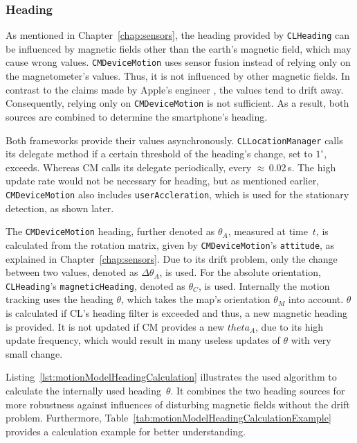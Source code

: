 \subsubsection*{Heading}
As mentioned in Chapter~\ref{chap:sensors}, the heading provided by \texttt{CLHeading} can be influenced by magnetic fields other than the earth's magnetic field, which may cause wrong values. \texttt{CMDeviceMotion} uses sensor fusion instead of relying only on the magnetometer's values. Thus, it is not influenced by other magnetic fields. In contrast to the claims made by Apple's engineer \citet{apple:wwdc_2012_pham}, the values tend to drift away. Consequently, relying only on \texttt{CMDeviceMotion} is not sufficient. As a result, both sources are combined to determine the smartphone's heading.

Both frameworks provide their values asynchronously. \texttt{CLLocationManager} calls its delegate method if a certain threshold of the heading's change, set to $1^\circ$, exceeds. Whereas \acs{CM} calls its delegate periodically, every $\approx$\,0.02\,s. The high update rate would not be necessary for heading, but as mentioned earlier, \texttt{CMDeviceMotion} also includes \texttt{userAccleration}, which is used for the stationary detection, as shown later.

The \texttt{CMDeviceMotion} heading, further denoted as $\theta_A$, measured at time~$t$, is calculated from the rotation matrix, given by \texttt{CMDeviceMotion}'s \texttt{attitude}, as explained in Chapter~\ref{chap:sensors}. Due to its drift problem, only the change between two values, denoted as $\Delta\theta_A$, is used. For the absolute orientation, \texttt{CLHeading}'s \texttt{magneticHeading}, denoted as $\theta_C$, is used. Internally the motion tracking uses the heading $\theta$, which takes the map's orientation $\theta_M$ into account. $\theta$ is calculated if \acs{CL}'s heading filter is exceeded and thus, a new magnetic heading is provided. It is not updated if \acs{CM} provides a new $theta_A$, due to its high update frequency, which would result in many useless updates of $\theta$ with very small change.

Listing~\ref{lst:motionModelHeadingCalculation} illustrates the used algorithm to calculate the internally used heading~$\theta$. It combines the two heading sources for more robustness against influences of disturbing magnetic fields without the drift problem. Furthermore, Table~\ref{tab:motionModelHeadingCalculationExample} provides a calculation example for better understanding.

